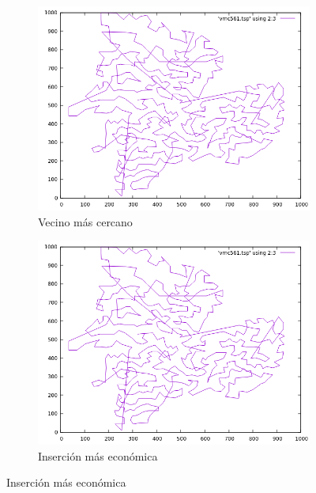 \documentclass[12pt,spanish]{article}
\begin{document}
\begin{figure}[H]
\centering
\begin{subfigure}[b]{0.36\textwidth}
\includegraphics[width=\textwidth]{pa561_vmc.png}
\caption{Vecino más cercano}
\end{subfigure}
\quad
\begin{subfigure}[b]{0.36\textwidth}
\includegraphics[width=\textwidth]{pa561_vmc.png}
\caption{Inserción más económica}
\end{subfigure}

\vspace{1cm}


\end{figure}
\end{document}

